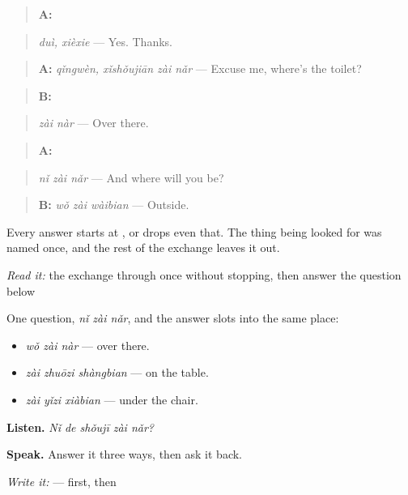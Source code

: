 \begin{quote}
\textbf{A:}  
\end{quote}

\begin{quote}
\emph{duì, xièxie} — Yes. Thanks.
\end{quote}

\begin{quote}
\textbf{A:} \emph{qǐngwèn, xǐshǒujiān zài nǎr} — Excuse me, where's the toilet?
\end{quote}

\begin{quote}
\textbf{B:} 
\end{quote}

\begin{quote}
\emph{zài nàr} — Over there.
\end{quote}

\begin{quote}
\textbf{A:} 
\end{quote}

\begin{quote}
\emph{nǐ zài nǎr} — And where will you be?
\end{quote}

\begin{quote}
\textbf{B:} \emph{wǒ zài wàibian} — Outside.
\end{quote}

Every answer starts at , or drops even that. The thing being looked for was named once, and the rest of the exchange leaves it out.

\begin{tcolorbox}[breakable,skin=enhanced,colback=orange!6,colframe=orange!45!black,boxrule=0.5pt,arc=1mm,left=6pt,right=6pt,top=4pt,bottom=4pt,fonttitle=\bfseries,title={Read this}]
\emph{Read it:} the exchange through once without stopping, then answer the question below
\end{tcolorbox}

\begin{grammarlens}[title={What you've built — one question, any answer}]
One question, \textbf{} \emph{nǐ zài nǎr}, and the answer slots into the same place:

\begin{itemize}
\raggedright
  \item \textbf{} \emph{wǒ zài nàr} — over there.
  \item \emph{zài zhuōzi shàngbian} — on the table.
  \item \emph{zài yǐzi xiàbian} — under the chair.
\end{itemize}

\textbf{Listen.} \emph{Nǐ de shǒujī zài nǎr?}

\textbf{Speak.} Answer it three ways, then ask it back.

\emph{Write it:}  —  first, then 
\end{grammarlens}

